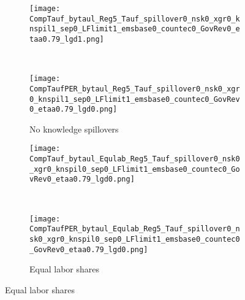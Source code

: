 \begin{figure}[h!!]
	\centering
	\caption{Necessary carbon tax with and without progressive income tax  }\label{fig:Limit_nsk0_xgr0_eual}
		\begin{subfigure}{0.7\textwidth}
		\caption{No knowledge spillovers}
		\begin{minipage}[]{0.45\textwidth}
			\texttt{[image: CompTauf\_bytaul\_Reg5\_Tauf\_spillover0\_nsk0\_xgr0\_knspil1\_sep0\_LFlimit1\_emsbase0\_countec0\_GovRev0\_etaa0.79\_lgd1.png]}
		\end{minipage}\begin{minipage}[]{0.05\textwidth}
			\
		\end{minipage}	
		\begin{minipage}[]{0.45\textwidth}
			\texttt{[image: CompTaufPER\_bytaul\_Reg5\_Tauf\_spillover0\_nsk0\_xgr0\_knspil1\_sep0\_LFlimit1\_emsbase0\_countec0\_GovRev0\_etaa0.79\_lgd0.png]} 
		\end{minipage}	
	\end{subfigure}	

	\begin{subfigure}{0.7\textwidth}
		\caption{Equal labor shares}
		\begin{minipage}[]{0.45\textwidth}
			\texttt{[image: CompTauf\_bytaul\_Equlab\_Reg5\_Tauf\_spillover0\_nsk0\_xgr0\_knspil0\_sep0\_LFlimit1\_emsbase0\_countec0\_GovRev0\_etaa0.79\_lgd0.png]}
		\end{minipage}\begin{minipage}[]{0.05\textwidth}
		\
	\end{minipage}	
		\begin{minipage}[]{0.45\textwidth}
			\texttt{[image: CompTaufPER\_bytaul\_Equlab\_Reg5\_Tauf\_spillover0\_nsk0\_xgr0\_knspil0\_sep0\_LFlimit1\_emsbase0\_countec0\_GovRev0\_etaa0.79\_lgd0.png]} 
		\end{minipage}	
	\end{subfigure}
	

\end{figure}
